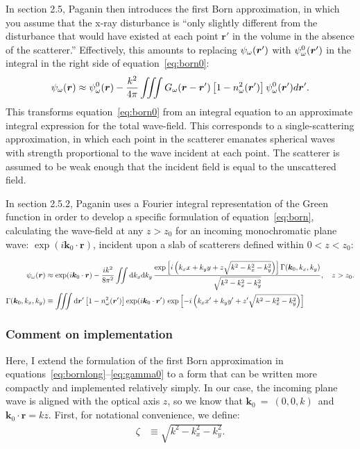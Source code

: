 \documentclass{article}
\begin{document}
In section 2.5, Paganin then introduces the first Born approximation, in which
you assume that the x-ray disturbance is ``only slightly different from the
disturbance that would have existed at each point $\bm{r}'$ in the volume in the
absence of the scatterer.'' Effectively, this amounts to replacing
$\psi_{\omega}(\bm{r}')$ with $\psi_{\omega}^0(\bm{r}')$ in the integral in the right side of
equation~\ref{eq:born0}:
\begin{align}
  \psi_{\omega}(\bm{r}) \approx \psi_{\omega}^0(\bm{r}) - \frac{k^2}{4\pi}\iiint G_{\omega}(\bm{r}-\bm{r}')\left[1 - n_{\omega}^2(\bm{r}')\right]\psi_{\omega}^0(\bm{r}')d\bm{r}'.
  \label{eq:born}
\end{align}
This transforms equation~\ref{eq:born0} from an integral equation to an
approximate integral expression for the total wave-field. This corresponds to a
single-scattering approximation, in which each point in the scatterer emanates
spherical waves with strength proportional to the wave incident at each
point. The scatterer is assumed to be weak enough that the incident field is
equal to the unscattered field.

In section 2.5.2, Paganin uses a Fourier integral representation of the Green
function in order to develop a specific formulation of equation~\ref{eq:born},
calculating the wave-field at any $z>z_0$ for an incoming monochromatic plane
wave: $\exp(i\bm{k}_0\cdot \bm{r})$, incident upon a slab of scatterers defined
within $0 < z < z_0$:

\begin{align}
  \psi_{\omega}(\bm{r}) &\approx \exp(i\bm{k}_0\cdot\bm{r}) - \frac{ik^2}{8\pi^2}\iint\mathrm{d}k_x\mathrm{d}k_y\,\frac{\exp\left[i\left(k_x x + k_y y + z\sqrt{k^2 - k_x^2 - k_y^2}\right)\right]\Gamma(\bm{k}_0, k_x, k_y)}{\sqrt{k^2-k_x^2-k_y^2}}, \quad z > z_0.\label{eq:bornlong}\\
  \Gamma(\bm{k}_0, k_x, k_y) &\equiv \iiint\mathrm{d}\bm{r}'\left[1 - n_{\omega}^2(\bm{r}')\right]\exp(i\bm{k}_0\cdot\bm{r}')\text{ exp}\left[-i\left(k_x x' + k_y y' + z'\sqrt{k^2 - k_x^2 - k_y^2}\right)\right]\label{eq:gamma0}
\end{align}

\subsubsection{Comment on implementation}
Here, I extend the formulation of the first Born approximation in
equations~\ref{eq:bornlong}--\ref{eq:gamma0} to a form that can be written more
compactly and implemented relatively simply. In our case, the incoming plane
wave is aligned with the optical axis $z$, so we know that
$\bm{k}_0~=~(0, 0, k)$~and $\bm{k}_0\cdot\bm{r} = kz$. First, for notational
convenience, we define:
\begin{align}
  \zeta &\equiv \sqrt{k^2 - k_x^2 - k_y^2}.
\end{align}
\end{document}
